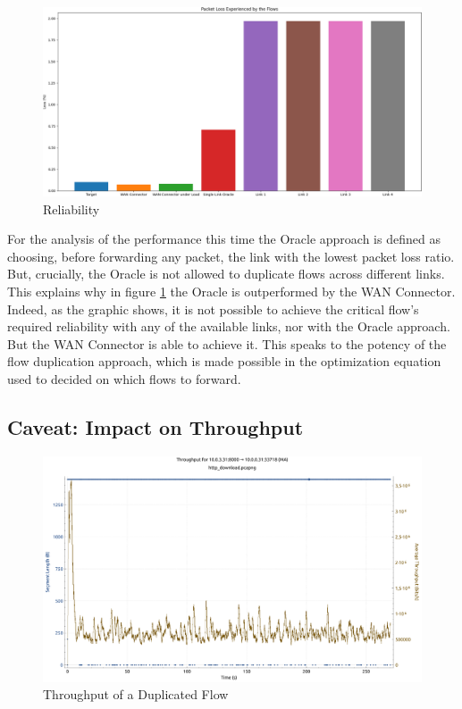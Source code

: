 \begin{figure}[h]
    \centering
        \includegraphics[height=0.66\textwidth,width=\textwidth]{fig/loss_bars1.png}
        \caption{Reliability}
        \label{fig:loss_bars1}
\end{figure}

For the analysis of the performance this time the Oracle approach is defined as choosing, before forwarding any packet, the link with the lowest packet loss ratio. But, crucially, the Oracle is not allowed to duplicate flows across different links. This explains why in figure \ref{fig:loss_bars1} the Oracle is outperformed by the WAN Connector. Indeed, as the graphic shows, it is not possible to achieve the critical flow's required reliability with any of the available links, nor with the Oracle approach. But the WAN Connector is able to achieve it. This speaks to the potency of the flow duplication approach, which is made possible in the optimization equation used to decided on which flows to forward.

\subsection{Caveat: Impact on Throughput}


\begin{figure}[h]
    \centering
        \includegraphics[height=0.66\textwidth,width=\textwidth]{fig/tcp_throughput.pdf}
        \caption{Throughput of a Duplicated Flow}
        \label{fig:dup_tcp}
\end{figure}

